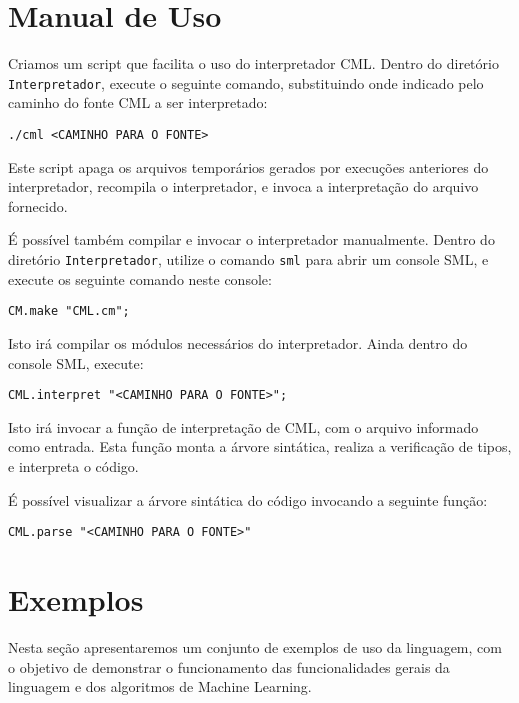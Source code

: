 \documentclass[12pt]{article}
\begin{document}
\section{Manual de Uso}\label{Man}

Criamos um script que facilita o uso do interpretador CML. Dentro do diretório \texttt{Interpretador}, execute o seguinte comando, substituindo onde indicado pelo caminho do fonte CML a ser interpretado:

\begin{verbatim}
./cml <CAMINHO PARA O FONTE>
\end{verbatim}

Este script apaga os arquivos temporários gerados por execuções anteriores do interpretador, recompila o interpretador, e invoca a interpretação do arquivo fornecido.

É possível também compilar e invocar o interpretador manualmente. Dentro do diretório \texttt{Interpretador}, utilize o comando \texttt{sml} para abrir um console SML, e execute os seguinte comando neste console:

\begin{verbatim}
CM.make "CML.cm";
\end{verbatim}

Isto irá compilar os módulos necessários do interpretador. Ainda dentro do console SML, execute:

\begin{verbatim}
CML.interpret "<CAMINHO PARA O FONTE>";
\end{verbatim}

Isto irá invocar a função de interpretação de CML, com o arquivo informado como entrada. Esta função monta a árvore sintática, realiza a verificação de tipos, e interpreta o código.

É possível visualizar a árvore sintática do código invocando a seguinte função:

\begin{verbatim}
CML.parse "<CAMINHO PARA O FONTE>"
\end{verbatim}

\section{Exemplos}\label{Exemplos}

Nesta seção apresentaremos um conjunto de exemplos de uso da linguagem, com o objetivo de demonstrar o funcionamento das funcionalidades gerais da linguagem e dos algoritmos de Machine Learning.
\end{document}
